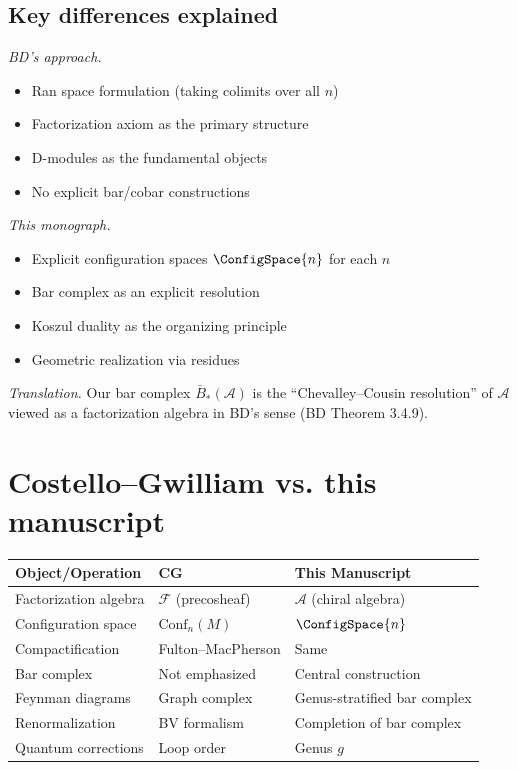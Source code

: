 \subsection{Key differences explained}

\emph{BD's approach.}
\begin{itemize}
\item Ran space formulation (taking colimits over all $n$)
\item Factorization axiom as the primary structure
\item D-modules as the fundamental objects
\item No explicit bar/cobar constructions
\end{itemize}

\emph{This monograph.}
\begin{itemize}
\item Explicit configuration spaces $\ConfigSpace{n}$ for each $n$
\item Bar complex as an explicit resolution
\item Koszul duality as the organizing principle
\item Geometric realization via residues
\end{itemize}

\emph{Translation.} Our bar complex $\bar{B}_*(\mathcal{A})$ is the ``Chevalley--Cousin resolution'' of $\mathcal{A}$ viewed as a factorization algebra in BD's sense (BD Theorem 3.4.9).

\section{Costello--Gwilliam vs. this manuscript}

\begin{center}
\begin{tabular}{|>{\raggedright\arraybackslash}p{5.8cm}|>{\raggedright\arraybackslash}p{3.9cm}|>{\raggedright\arraybackslash}p{3.9cm}|}
\hline
\textbf{Object/Operation} & \textbf{CG \cite{CG17}} & \textbf{This Manuscript} \\
\hline
Factorization algebra & $\mathcal{F}$ (precosheaf) & $\mathcal{A}$ (chiral algebra) \\
Configuration space & $\text{Conf}_n(M)$ & $\ConfigSpace{n}$ \\
Compactification & Fulton--MacPherson & Same \\
Bar complex & Not emphasized & Central construction \\
Feynman diagrams & Graph complex & Genus-stratified bar complex \\
Renormalization & BV formalism & Completion of bar complex \\
Quantum corrections & Loop order & Genus $g$ \\
\hline
\end{tabular}
\end{center}

